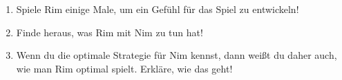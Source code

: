 \documentclass[a4paper,ngerman,14pt]{scrartcl}
\begin{document}
\begin{enumerate}
\item Spiele Rim einige Male, um ein Gefühl für das Spiel zu entwickeln!
\item Finde heraus, was Rim mit Nim zu tun hat!
\item Wenn du die optimale Strategie für Nim kennst, dann weißt du daher auch,
wie man Rim optimal spielt. Erkläre, wie das geht!
\end{enumerate}
\end{document}
